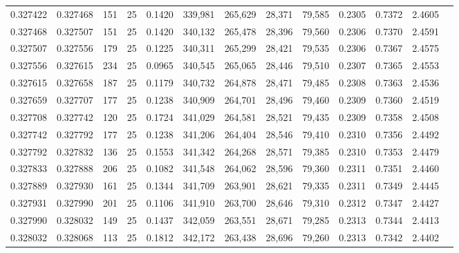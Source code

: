 \begin{tabular}{rrrrrrrrrrrrr}
0.327422 & 0.327468 &   151 &  25 &                                     0.1420 & 339,981 & 265,629 &  28,371 &  79,585 & 0.2305 & 0.7372 & 2.4605 \\
0.327468 & 0.327507 &   151 &  25 &                                     0.1420 & 340,132 & 265,478 &  28,396 &  79,560 & 0.2306 & 0.7370 & 2.4591 \\
0.327507 & 0.327556 &   179 &  25 &                                     0.1225 & 340,311 & 265,299 &  28,421 &  79,535 & 0.2306 & 0.7367 & 2.4575 \\
0.327556 & 0.327615 &   234 &  25 &                                     0.0965 & 340,545 & 265,065 &  28,446 &  79,510 & 0.2307 & 0.7365 & 2.4553 \\
0.327615 & 0.327658 &   187 &  25 &                                     0.1179 & 340,732 & 264,878 &  28,471 &  79,485 & 0.2308 & 0.7363 & 2.4536 \\
0.327659 & 0.327707 &   177 &  25 &                                     0.1238 & 340,909 & 264,701 &  28,496 &  79,460 & 0.2309 & 0.7360 & 2.4519 \\
0.327708 & 0.327742 &   120 &  25 &                                     0.1724 & 341,029 & 264,581 &  28,521 &  79,435 & 0.2309 & 0.7358 & 2.4508 \\
0.327742 & 0.327792 &   177 &  25 &                                     0.1238 & 341,206 & 264,404 &  28,546 &  79,410 & 0.2310 & 0.7356 & 2.4492 \\
0.327792 & 0.327832 &   136 &  25 &                                     0.1553 & 341,342 & 264,268 &  28,571 &  79,385 & 0.2310 & 0.7353 & 2.4479 \\
0.327833 & 0.327888 &   206 &  25 &                                     0.1082 & 341,548 & 264,062 &  28,596 &  79,360 & 0.2311 & 0.7351 & 2.4460 \\
0.327889 & 0.327930 &   161 &  25 &                                     0.1344 & 341,709 & 263,901 &  28,621 &  79,335 & 0.2311 & 0.7349 & 2.4445 \\
0.327931 & 0.327990 &   201 &  25 &                                     0.1106 & 341,910 & 263,700 &  28,646 &  79,310 & 0.2312 & 0.7347 & 2.4427 \\
0.327990 & 0.328032 &   149 &  25 &                                     0.1437 & 342,059 & 263,551 &  28,671 &  79,285 & 0.2313 & 0.7344 & 2.4413 \\
0.328032 & 0.328068 &   113 &  25 &                                     0.1812 & 342,172 & 263,438 &  28,696 &  79,260 & 0.2313 & 0.7342 & 2.4402 \\

\end{tabular}
